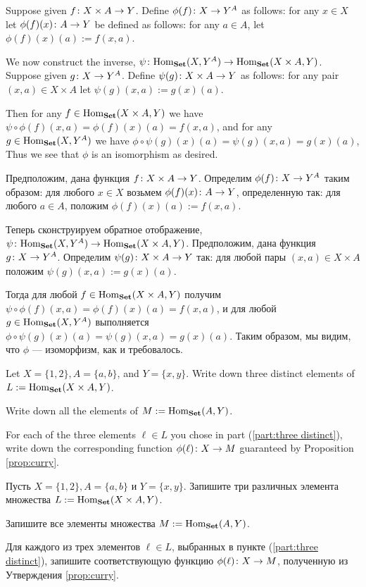 \documentclass[CT4S-EN-RU]{subfiles}
\begin{document}
\begin{proofENG}
Suppose given $f\colon X\times A\rightarrow Y$. Define $\phi(f)\colon X\rightarrow Y^A$ as follows: for any $x\in X$ let $\phi(f)(x)\colon A\rightarrow Y$ be defined as follows: for any $a\in A$, let $\phi(f)(x)(a):=f(x,a)$. 

We now construct the inverse, $\psi\colon\textnormal{Hom}_{\bf Set}(X,Y^A)\rightarrow\textnormal{Hom}_{\bf Set}(X\times A,Y)$. Suppose given $g\colon X\rightarrow Y^A$. Define $\psi(g)\colon X\times A\rightarrow Y$ as follows: for any pair $(x,a)\in X\times A$ let $\psi(g)(x,a):=g(x)(a)$. 

Then for any $f\in\textnormal{Hom}_{\bf Set}(X\times A,Y)$ we have $\psi\circ\phi(f)(x,a)=\phi(f)(x)(a)=f(x,a)$, and for any $g\in\textnormal{Hom}_{\bf Set}(X,Y^A)$ we have $\phi\circ\psi(g)(x)(a)=\psi(g)(x,a)=g(x)(a)$, Thus we see that $\phi$ is an isomorphism as desired.
\end{proofENG}

\begin{proofRUS}
Предположим, дана функция $f\colon X\times A\rightarrow Y$. Определим $\phi(f)\colon X\rightarrow Y^A$ таким образом: для любого $x\in X$ возьмем $\phi(f)(x)\colon A\rightarrow Y$, определенную так: для любого $a\in A$, положим $\phi(f)(x)(a):=f(x,a)$. 

Теперь сконструируем обратное отображение, $\psi\colon\textnormal{Hom}_{\bf Set}(X,Y^A)\rightarrow\textnormal{Hom}_{\bf Set}(X\times A,Y)$.  Предположим, дана функция $g\colon X\rightarrow Y^A$. Определим $\psi(g)\colon X\times A\rightarrow Y$ так: для любой пары $(x,a)\in X\times A$ положим $\psi(g)(x,a):=g(x)(a)$. 

Тогда для любой $f\in\textnormal{Hom}_{\bf Set}(X\times A,Y)$ получим $\psi\circ\phi(f)(x,a)=\phi(f)(x)(a)=f(x,a)$, и для любой $g\in\textnormal{Hom}_{\bf Set}(X,Y^A)$ выполняется $\phi\circ\psi(g)(x)(a)=\psi(g)(x,a)=g(x)(a)$. Таким образом, мы видим, что $\phi$ — изоморфизм, как и требовалось.
\end{proofRUS}

\begin{exerciseENG}
Let $X=\{1,2\}, A=\{a,b\}$, and $Y=\{x,y\}$. 
\sexc\label{part:three distinct} Write down three distinct elements of $L:=\textnormal{Hom}_{\bf Set}(X\times A,Y)$. 
\item Write down all the elements of $M:=\textnormal{Hom}_{\bf Set}(A,Y)$. 
\item For each of the three elements $\ell\in L$ you chose in part (\ref{part:three distinct}), write down the corresponding function $\phi(\ell)\colon X\rightarrow M$ guaranteed by Proposition \ref{prop:curry}.
\endsexc
\end{exerciseENG}

\begin{exerciseRUS}
Пусть $X=\{1,2\}, A=\{a,b\}$ и $Y=\{x,y\}$. 
\sexc\label{part:three distinct} Запишите три различных элемента множества $L:=\textnormal{Hom}_{\bf Set}(X\times A,Y)$. 
\item Запишите все элементы множества $M:=\textnormal{Hom}_{\bf Set}(A,Y)$. 
\item Для каждого из трех элементов $\ell\in L$, выбранных в пункте (\ref{part:three distinct}), запишите соответствующую функцию $\phi(\ell)\colon X\rightarrow M$, полученную из Утверждения \ref{prop:curry}.
\endsexc
\end{exerciseRUS}
\end{document}
